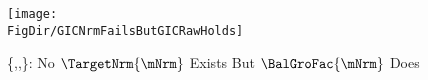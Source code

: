 \begin{figure}[tbp]
\centerline{\texttt{[image: \\FigDir/GICNrmFailsButGICRawHolds]}}
\caption{\{\FVAC,\GICRaw,\cncl{\GICNrm}\}: No $\TargetNrm{\mNrm}$ Exists But $\BalGroFac{\mNrm}$ Does}
\label{fig:GICNrmFailsButGICRawHolds}
\end{figure}
